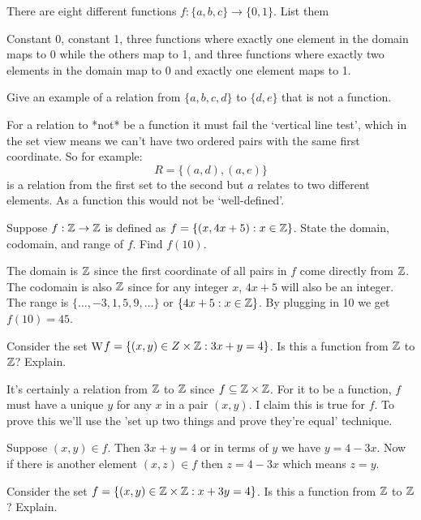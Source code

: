 \documentclass{article}
\begin{document}
\begin{problem}
There are eight different functions $f: \{a, b, c\} \to \{0, 1\}$. List them
\end{problem}

Constant 0, constant 1, three functions where exactly one element in the domain maps to 0 while the others map to 1, and three functions where exactly two elements in the domain map to 0 and exactly one element maps to 1.

\begin{problem}
Give an example of a relation from $\{a, b, c, d\}$ to $\{d, e\}$ that is not a function.
\end{problem}

For a relation to *not* be a function it must fail the `vertical line test', which in the set view means we can't have two ordered pairs with the same first coordinate. So for example:
$$R = \{(a, d), (a, e)\}$$
is a relation from the first set to the second but $a$ relates to two different elements. As a function this would not be `well-defined'.

\begin{problem}
Suppose $f: \mathbb{Z} \to \mathbb{Z}$ is defined as $f = \{(x, 4x + 5): x \in \mathbb{Z}\}$. State the domain, codomain, and range of $f$. Find $f(10)$.
\end{problem}

The domain is $\mathbb{Z}$ since the first coordinate of all pairs in $f$ come directly from $\mathbb{Z}$. The codomain is also $\mathbb{Z}$ since for any integer $x$, $4x + 5$ will also be an integer. The range is $\{\ldots, -3, 1, 5, 9, \ldots\}$ or $\{4x + 5: x \in \mathbb{Z}\}$. By plugging in 10 we get $f(10) = 45$.

\begin{problem}
Consider the set W$f = \{(x, y) \in Z \times \mathbb{Z}: 3x + y = 4\}$. Is this a function from $\mathbb{Z}$ to $\mathbb{Z}$? Explain.
\end{problem}

It's certainly a relation from $\mathbb{Z}$ to $\mathbb{Z}$ since $f \subseteq \mathbb{Z} \times \mathbb{Z}$. For it to be a function, $f$ must have a unique $y$ for any $x$ in a pair $(x, y)$. I claim this is true for $f$. To prove this we'll use the 'set up two things and prove they're equal' technique.

Suppose $(x, y) \in f$. Then $3x + y = 4$ or in terms of $y$ we have $y = 4 - 3x$. Now if there is another element $(x, z) \in f$ then $z = 4 - 3x$ which means $z = y$.

\begin{problem}
Consider the set $f = \{ (x, y) \in \mathbb{Z} \times \mathbb{Z}: x + 3y = 4\}$. Is this a function from $\mathbb{Z}$ to $\mathbb{Z}$? Explain.
\end{problem}
\end{document}
